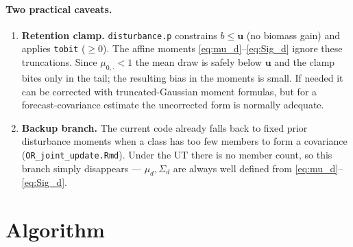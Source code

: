 \documentclass[11pt]{article}
\newcommand{\code}[1]{\texttt{#1}}
\newcommand{\bm}[1]{\boldsymbol{#1}}
\begin{document}
\paragraph{Two practical caveats.}
\begin{enumerate}[nosep]
  \item \textbf{Retention clamp.} \code{disturbance.p} constrains
        $b\le \bm u$ (no biomass gain) and applies \code{tobit} ($\ge 0$). The affine
        moments \eqref{eq:mu_d}--\eqref{eq:Sig_d} ignore these truncations. Since
        $\mu_{0,\cdot}<1$ the mean draw is safely below $\bm u$ and the clamp bites only
        in the tail; the resulting bias in the moments is small. If needed it can be
        corrected with truncated-Gaussian moment formulas, but for a forecast-covariance
        estimate the uncorrected form is normally adequate.
  \item \textbf{Backup branch.} The current code already falls back to fixed prior
        disturbance moments when a class has too few members to form a covariance
        (\code{OR\_joint\_update.Rmd}). Under the UT there is no member count, so this
        branch simply disappears --- $\mu_d,\Sigma_d$ are always well defined from
        \eqref{eq:mu_d}--\eqref{eq:Sig_d}.
\end{enumerate}

\section{Algorithm}
\label{sec:algo}
\end{document}
